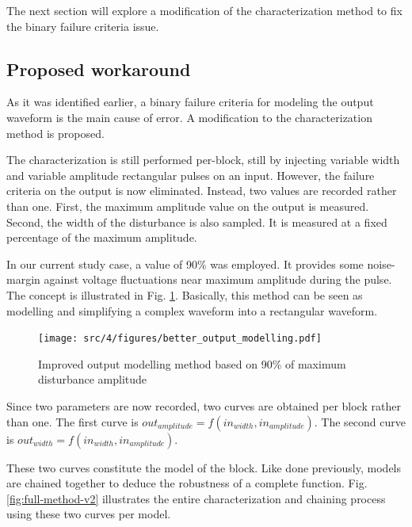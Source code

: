 
The next section will explore a modification of the characterization method to fix the binary failure criteria issue.

\subsection{Proposed workaround}
As it was identified earlier, a binary failure criteria for modeling the output waveform is the main cause of error.
A modification to the characterization method is proposed.

The characterization is still performed per-block, still by injecting variable width and variable amplitude rectangular pulses on an input.
However, the failure criteria on the output is now eliminated.
Instead, two values are recorded rather than one.
First, the maximum amplitude value on the output is measured.
Second, the width of the disturbance is also sampled.
It is measured at a fixed percentage of the maximum amplitude.

In our current study case, a value of 90\% was employed.
It provides some noise-margin against voltage fluctuations near maximum amplitude during the pulse.
The concept is illustrated in Fig. \ref{fig:impact-single-failure-criteria}.
Basically, this method can be seen as modelling and simplifying a complex waveform into a rectangular waveform.

\begin{figure}[!h]
  \centering
  \texttt{[image: src/4/figures/better\_output\_modelling.pdf]}
  \caption{Improved output modelling method based on 90\% of maximum disturbance amplitude}
  \label{fig:impact-single-failure-criteria}
\end{figure}

Since two parameters are now recorded, two curves are obtained per block rather than one.
The first curve is $out_{amplitude} = f(in_{width}, in_{amplitude})$.
The second curve is $out_{width} = f(in_{width}, in_{amplitude})$.

These two curves constitute the model of the block.
Like done previously, models are chained together to deduce the robustness of a complete function.
Fig. \ref{fig:full-method-v2} illustrates the entire characterization and chaining process using these two curves per model.

